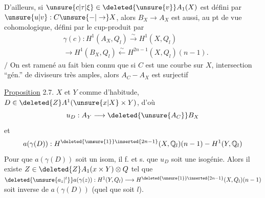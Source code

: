 D'ailleurs, si $\unsure{c|\tau|\xi}\in\deleted{\unsure{v}}A_1(X)$ est défini par $\unsure{u|v}:C\unsure{\mathbin{-}|\to}X$, alors $B_X\to A_X$ est aussi, au pt de vue cohomologique, défini par le cup-produit par
\[
\begin{aligned}
&\gamma(c):H^1(A_X,Q_l)\xrightarrow{\sim}H^1(X,Q_l)\\
&\longrightarrow H^1(B_X,Q_l)\xleftarrow{\sim}H^{2n-1}(X,Q_l)(n-1).
\end{aligned}
\]
$/$ On est ramené au fait bien connu que si $C$ est une courbe sur $X$, intersection ``gén.'' de diviseurs très amples, alors $A_C\mathbin{-}A_X$ est surjectif

\uline{Proposition} 2.7. $X$ et $Y$ comme d'habitude, $D\in\deleted{Z}A^1(\unsure{x|X}\times Y)$, d'où
\[
u_D:A_Y\longrightarrow\deleted{\unsure{A_C}}B_X
\]
et
\[
a(\gamma(D)):H^{\deleted{\unsure{1}}\inserted{2n-1}}(X,\mathbb Q_l)(n-1)\mathbin{-}H^1(Y,\mathbb Q_l)
\]
Pour que $a(\gamma(D))$ soit un isom, il f. et s. que $u_D$ soit une isogénie. Alors il existe $Z\in\deleted{Z}A_1(x\times Y)\otimes Q$ tel que $\deleted{\unsure{a_z|{}^t}}a(\gamma(z)):H^1(Y,Q_l)\longrightarrow H^{\deleted{\unsure{1}}\inserted{2n-1}}(X,Q_l)(n-1)$ soit  inverse de $a(\gamma(D))$ (quel que soit $l$). 

